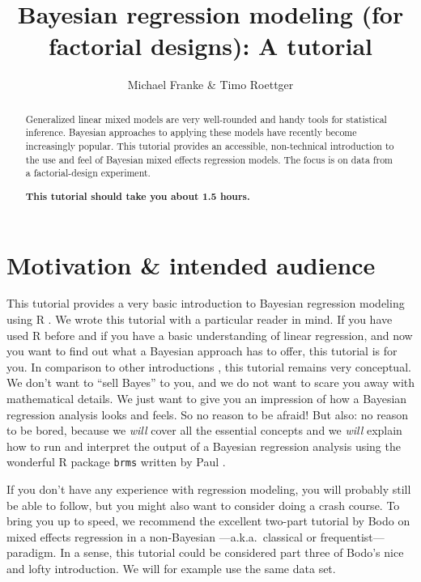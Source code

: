 \documentclass[nobib]{tufte-handout}
\title{Bayesian regression modeling (for factorial designs): A tutorial}
\author{Michael Franke \& Timo Roettger}
\date{}
\begin{document}
\maketitle

\begin{abstract}
  \noindent Generalized linear mixed models are very well-rounded and handy tools for statistical inference. Bayesian approaches to applying these models have recently become increasingly popular. This tutorial provides an accessible, non-technical introduction to the use and feel of Bayesian mixed effects regression models. The focus is on data from a factorial-design experiment. \\
  
  \medskip
  
  \noindent \textbf{This tutorial should take you about 1.5 hours.}
\end{abstract}

\section{Motivation \& intended audience}

This tutorial provides a very basic introduction to Bayesian regression modeling using R \citep{Manual}. We wrote this tutorial with a particular reader in mind. If you have used R before and if you have a basic understanding of linear regression, and now you want to find out what a Bayesian approach has to offer, this tutorial is for you. In comparison to other introductions \citep[e.g.][]{SorensenHohensteinb2016:Bayesian-linear}, this tutorial remains very conceptual. We don’t want to ``sell Bayes'' to you, and we do not want to scare you away with mathematical details. We just want to give you an impression of how a Bayesian regression analysis looks and feels. So no reason to be afraid! But also: no reason to be bored, because we \emph{will} cover all the essential concepts and we \emph{will} explain how to run and interpret the output of a Bayesian regression analysis using the wonderful R package \texttt{brms} written by Paul \citet{buerkner2016brms}.



If you don’t have any experience with regression modeling, you will probably still be able to follow, but you might also want to consider doing a crash course. To bring you up to speed, we recommend the excellent two-part tutorial by Bodo \citet{Winter2013:Linear-models-a} on mixed effects regression in a non-Bayesian ---a.k.a.~classical or frequentist--- paradigm. In a sense, this tutorial could be considered part three of Bodo's nice and lofty introduction. We will for example use the same data set.
\end{document}
